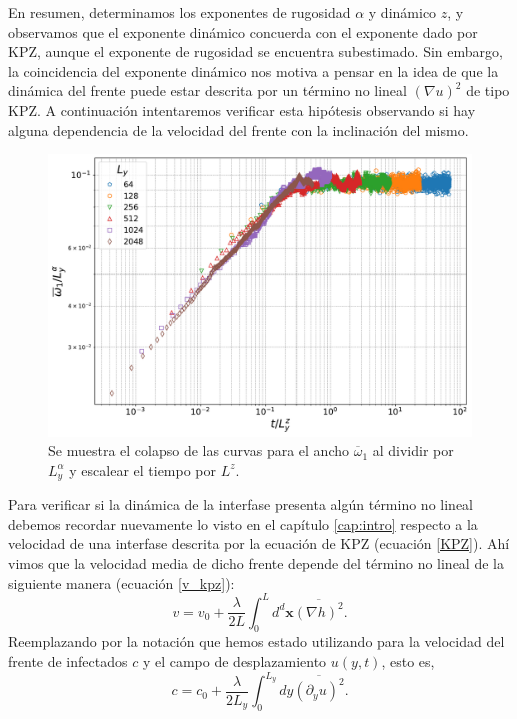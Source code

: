 En resumen, determinamos los exponentes de rugosidad $\alpha$ y dinámico $z$, y observamos que el exponente dinámico concuerda con el exponente dado por KPZ, aunque el exponente de rugosidad se encuentra subestimado. Sin embargo, la coincidencia del exponente dinámico nos motiva a pensar en la idea de que la dinámica del frente puede estar descrita por un término no lineal $(\nabla u)^2$ de tipo KPZ. A continuación intentaremos verificar esta hipótesis observando si hay alguna dependencia de la velocidad del frente con la inclinación del mismo.

\begin{figure}[!b]
    \centering
    \includegraphics[width=\imsizeL]{colapse.pdf}
    \caption{Se muestra el colapso de las curvas para el ancho $\overline{\omega}_1$ al dividir por $L_y^{\alpha}$ y  escalear el tiempo por $L^z$.}
    \label{fig:colapse}
\end{figure}



Para verificar si la dinámica de la interfase presenta algún término no lineal debemos recordar nuevamente lo visto en el capítulo \ref{cap:intro} respecto a la velocidad de una interfase descrita por la ecuación de KPZ (ecuación \ref{KPZ}). Ahí vimos que la velocidad media de dicho frente depende del término no lineal de la siguiente manera (ecuación \ref{v_kpz}):
\begin{equation}
    v = v_0 + \frac{\lambda}{2L} \int_0^L d^d\mathbf{x} \overline{\left(\nabla h\right)^2}.
\end{equation}
Reemplazando por la notación que hemos estado utilizando para la velocidad del frente de infectados $c$ y el campo de desplazamiento $u(y,t)$, esto es,
\begin{equation}
    c = c_0 + \frac{\lambda}{2L_y} \int_0^{L_y} dy \overline{\left(\partial_y u\right)^2}.
    \label{c_m}
\end{equation}

